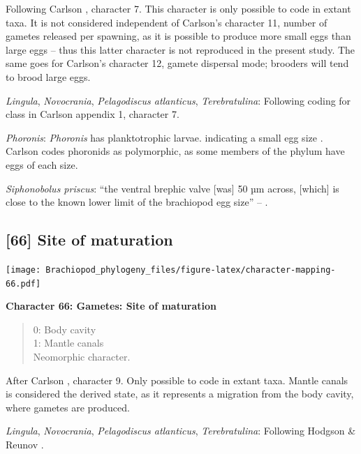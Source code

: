 \documentclass[openany]{book}
\theoremstyle{definition}
\theoremstyle{definition}
\theoremstyle{definition}
\theoremstyle{remark}
\begin{document}
Following Carlson \citeyearpar{Carlson1995Phylogeneticrelationships},
character 7. This character is only possible to code in extant taxa. It
is not considered independent of Carlson's character 11, number of
gametes released per spawning, as it is possible to produce more small
eggs than large eggs -- thus this latter character is not reproduced in
the present study. The same goes for Carlson's character 12, gamete
dispersal mode; brooders will tend to brood large eggs.

\hypertarget{Lingula-coding-65}{}
\emph{Lingula}, \emph{Novocrania}, \emph{Pelagodiscus atlanticus},
\emph{Terebratulina}: Following coding for class in Carlson
\citeyearpar{Carlson1995Phylogeneticrelationships} appendix 1, character
7.

\hypertarget{Phoronis-coding-65}{}
\emph{Phoronis}: \emph{Phoronis} has planktotrophic larvae. indicating a
small egg size \citep{Ruppert2004Invertebratezoology}. Carlson
\citeyearpar{Carlson1995Phylogeneticrelationships} codes phoronids as
polymorphic, as some members of the phylum have eggs of each size.

\hypertarget{Siphonobolus_priscus-coding-65}{}
\emph{Siphonobolus priscus}: ``the ventral brephic valve {[}was{]} 50 µm
across, {[}which{]} is close to the known lower limit of the brachiopod
egg size'' -- \citet{Popov2009Earlyontogeny}.

\subsection*{{[}66{]} Site of maturation}\label{site-of-maturation}

\texttt{[image: Brachiopod\_phylogeny\_files/figure-latex/character-mapping-66.pdf]}

\textbf{Character 66: Gametes: Site of maturation}

\begin{quote}
0: Body cavity\\
1: Mantle canals\\
Neomorphic character.
\end{quote}

After Carlson \citeyearpar{Carlson1995Phylogeneticrelationships},
character 9. Only possible to code in extant taxa. Mantle canals is
considered the derived state, as it represents a migration from the body
cavity, where gametes are produced.

\hypertarget{Lingula-coding-66}{}
\emph{Lingula}, \emph{Novocrania}, \emph{Pelagodiscus atlanticus},
\emph{Terebratulina}: Following Hodgson \& Reunov
\citeyearpar{Hodgson1994Ultrastructureof}.
\end{document}
